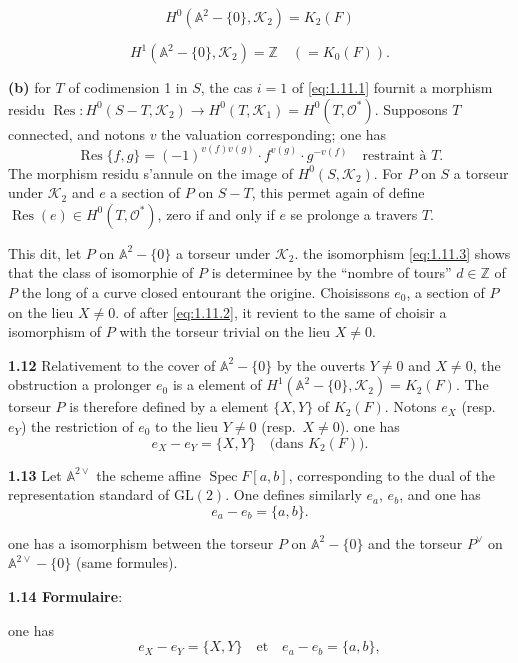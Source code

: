 \documentclass[12pt,a4paper]{article}
\theoremstyle{plain}
\theoremstyle{definition}
\theoremstyle{remark}
\DeclareMathOperator{\Res}{Res}
\newcommand{\ZZ}{\mathbb{Z}}
\newcommand{\cO}{\mathcal{O}}
\newcommand{\cK}{\mathcal{K}}
\providecommand{\AA}{\mathbb{A}}
\providecommand{\ZZ}{\mathbb{Z}}
\providecommand{\cK}{\mathcal{K}}
\providecommand{\cO}{\mathcal{O}}
\providecommand{\Spec}{\operatorname{Spec}}
\begin{document}
\begin{equation}\label{eq:1.11.2}
H^0(\AA^2 - \{0\}, \cK_2) = K_2(F)
\tag{1.11.2}
\end{equation}

\begin{equation}\label{eq:1.11.3}
H^1(\AA^2 - \{0\}, \cK_2) = \ZZ \quad (= K_0(F)).
\tag{1.11.3}
\end{equation}

\textbf{(b)} for $T$ of codimension 1 in $S$, the cas $i = 1$ of \eqref{eq:1.11.1} fournit a morphism residu $\Res : H^0(S - T, \cK_2) \to H^0(T, \cK_1) = H^0(T, \cO^*)$. Supposons $T$ connected, and notons $v$ the valuation corresponding; one has
\[
\Res\{f, g\} = (-1)^{v(f)v(g)} \cdot f^{v(g)} \cdot g^{-v(f)} \quad \text{restraint à } T.
\]
The morphism residu s'annule on the image of $H^0(S, \cK_2)$. For $P$ on $S$ a torseur under $\cK_2$ and $e$ a section of $P$ on $S - T$, this permet again of define $\Res(e) \in H^0(T, \cO^*)$, zero if and only if $e$ se prolonge a travers $T$.

This dit, let $P$ on $\AA^2 - \{0\}$ a torseur under $\cK_2$. the isomorphism \eqref{eq:1.11.3} shows that the class of isomorphie of $P$ is determinee by the ``nombre of tours'' $d \in \ZZ$ of $P$ the long of a curve closed entourant the origine. Choisissons $e_0$, a section of $P$ on the lieu $X \neq 0$. of after \eqref{eq:1.11.2}, it revient to the same of choisir a isomorphism of $P$ with the torseur trivial on the lieu $X \neq 0$.

\textbf{1.12} Relativement to the cover of $\AA^2 - \{0\}$ by the ouverts $Y \neq 0$ and $X \neq 0$, the obstruction a prolonger $e_0$ is a element of $H^1(\AA^2 - \{0\}, \cK_2) = K_2(F)$. The torseur $P$ is therefore defined by a element $\{X, Y\}$ of $K_2(F)$. Notons $e_X$ (resp.\ $e_Y$) the restriction of $e_0$ to the lieu $Y \neq 0$ (resp.\ $X \neq 0$). one has
\[
e_X - e_Y = \{X, Y\} \quad \text{(dans } K_2(F)\text{).}
\]

\textbf{1.13} Let $\AA^{2\vee}$ the scheme affine $\Spec F[a, b]$, corresponding to the dual of the representation standard of $\mathrm{GL}(2)$. One defines similarly $e_a$, $e_b$, and one has
\[
e_a - e_b = \{a, b\}.
\]

one has a isomorphism between the torseur $P$ on $\AA^2 - \{0\}$ and the torseur $P^\vee$ on $\AA^{2\vee} - \{0\}$ (same formules).

\textbf{1.14 Formulaire}:

one has
\begin{equation}\label{eq:1.14.1}
e_X - e_Y = \{X, Y\} \quad \text{et} \quad e_a - e_b = \{a, b\},
\tag{1.14.1}
\end{equation}
\end{document}
